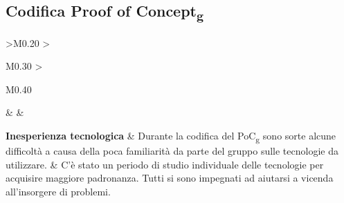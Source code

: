 \subsection{Codifica Proof of Concept\textsubscript{g}}
\begin{longtable}{ 
	>{\centering}M{0.20\textwidth} 
	>{\raggedright}M{0.30\textwidth}
	>{\raggedright}M{0.40\textwidth}
	}
	\rowcolorhead
	\centering 
	 &	
	 &
	\endfirsthead	
	\endhead
	
	\textbf{Inesperienza tecnologica} & 
    Durante la codifica del PoC\textsubscript{g} sono sorte alcune difficoltà a causa della poca
    familiarità da parte del gruppo sulle tecnologie da utilizzare. & 
    C'è stato un periodo di studio individuale delle tecnologie per acquisire maggiore padronanza. 
    Tutti si sono impegnati ad aiutarsi a vicenda all'insorgere di problemi. \tabularnewline
	\captionline \caption{Attualizzazione dei rischi nel periodo di Codifica Proof of Concept\textsubscript{g}}
\end{longtable}